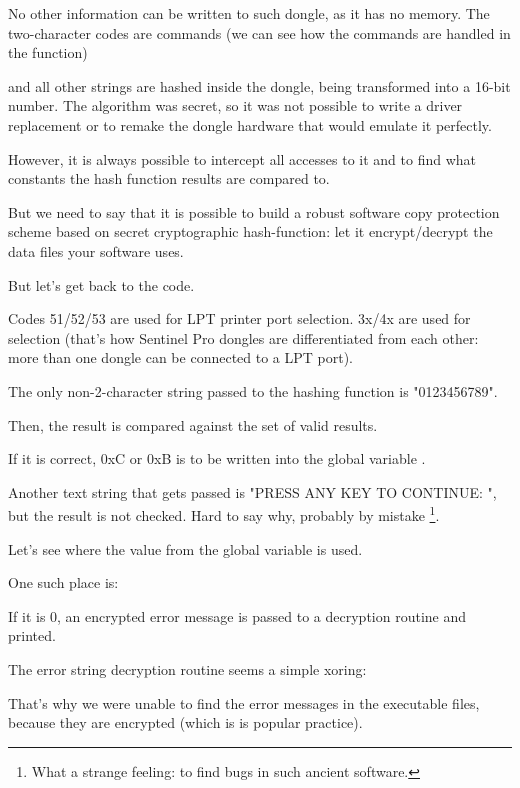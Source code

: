 No other information can be written to such dongle, as it has no memory.
The two-character codes are commands
(we can see how the commands are handled in the 
 function) 

and all other strings are hashed inside the dongle, being transformed into a 16-bit number.
The algorithm was secret,
so it was not possible to write a driver replacement or to remake the dongle hardware that would emulate it perfectly.

However, it is always possible to intercept all accesses to it and to find what constants
the hash function results are compared to.

But we need to say that it is possible to build a robust software copy protection scheme based on secret
cryptographic hash-function: let it encrypt/decrypt the data files your software uses.

But let's get back to the code.

Codes 51/52/53 
are used for LPT printer port selection.
3x/4x are used for  
selection (that's how Sentinel Pro dongles are differentiated from each other: more than one
dongle can be connected to a LPT port).

The only non-2-character string passed to the hashing function is "0123456789".

Then, the result is compared against the set of valid results.

If it is correct, 0xC or 0xB is to be written into the global variable .%

Another text string that gets passed is
"PRESS ANY KEY TO CONTINUE: ", but the result is not checked.
Hard to say why, probably by mistake
\footnote{What a strange feeling: to find bugs in such ancient software.}.

Let's see where the value from the global variable  is used.

One such place is:



If it is 0, an encrypted error message is passed to a decryption routine and printed.


The error string decryption routine seems a simple \gls{xoring}:



That's why we were unable to find the error messages in the executable files, because they are encrypted
(which is is popular practice).

